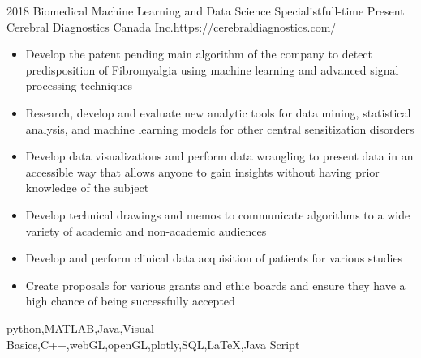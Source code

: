 %
%
%




\begin{experiences}
	
	\myExperience
	{2018}       {Biomedical Machine Learning and Data Science Specialist}{full-time}
	{Present}      {Cerebral Diagnostics Canada Inc.}{https://cerebraldiagnostics.com/}
	{
		\begin{itemize}
			\item  Develop the patent pending main algorithm of the company to detect predisposition of Fibromyalgia using machine learning and advanced signal processing techniques
			\item Research, develop and evaluate new analytic tools for data mining, statistical analysis, and machine learning models for other central sensitization disorders
			\item Develop data visualizations and perform data wrangling to present data in an accessible way that allows anyone to gain insights without having prior knowledge of the subject
			\item Develop technical drawings and memos to communicate algorithms to a wide variety of academic and non-academic audiences
			\item Develop and perform clinical data acquisition of patients for various studies
			\item Create proposals for various grants and ethic boards and ensure they have a high chance of being successfully accepted
		\end{itemize}
	}
	{python,MATLAB,Java,Visual Basics,C++,webGL,openGL,plotly,SQL,\LaTeX,Java Script}
	
	\emptySeparator
	

\end{experiences}
